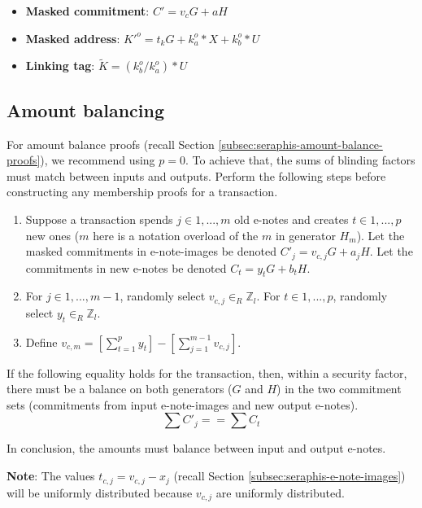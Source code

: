 \begin{itemize}
    \item \textbf{Masked commitment}: $C' = v_c G + a H$
    \item \textbf{Masked address}: $K'^o = t_k G + k^o_a*X + k^o_b*U$
    \item \textbf{Linking tag}: $\tilde{K} = (k^o_b/k^o_a)*U$
\end{itemize}


\subsection{Amount balancing}
\label{subsec:implementers-amount-balancing}

For amount balance proofs (recall Section \ref{subsec:seraphis-amount-balance-proofs}), we recommend using $p = 0$. To achieve that, the sums of blinding factors must match between inputs and outputs. Perform the following steps before constructing any membership proofs for a transaction.

\begin{enumerate}
    \item Suppose a transaction spends $j \in 1,...,m$ old e-notes and creates $t \in 1,...,p$ new ones ($m$ here is a notation overload of the $m$ in generator $H_m$). Let the masked commitments in e-note-images be denoted $C'_j = v_{c,j} G + a_j H$. Let the commitments in new e-notes be denoted $C_t = y_t G + b_t H$.

    \item For $j \in 1,...,m-1$, randomly select $v_{c,j} \in_R \mathbb{Z}_l$. For $t \in 1,...,p$, randomly select $y_t \in_R \mathbb{Z}_l$.

    \item Define $v_{c,m} = [\sum^{p}_{t=1} y_t] - [\sum^{m-1}_{j=1} v_{c,j}]$.
\end{enumerate}

If the following equality holds for the transaction, then, within a security factor, there must be a balance on both generators ($G$ and $H$) in the two commitment sets (commitments from input e-note-images and new output e-notes).\vspace{.115cm}
\[\sum C'_j == \sum C_t\]

In conclusion, the amounts must balance between input and output e-notes.

\textbf{Note}: The values $t_{c,j} = v_{c,j} - x_j$ (recall Section \ref{subsec:seraphis-e-note-images}) will be uniformly distributed because $v_{c,j}$ are uniformly distributed.

